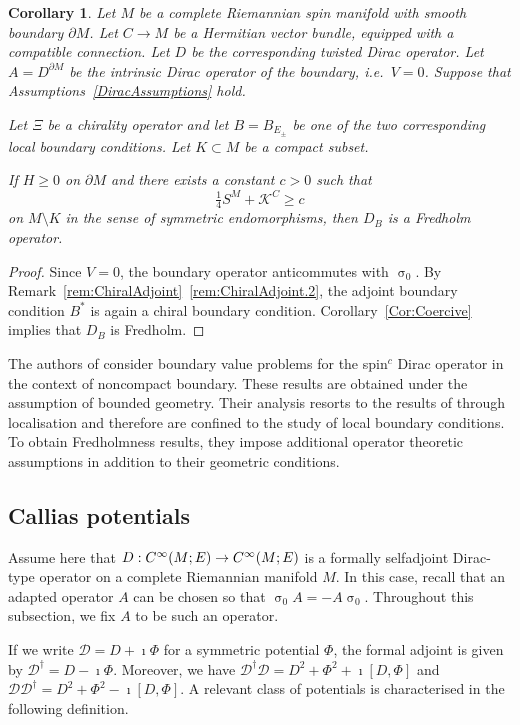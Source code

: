 \documentclass[a4paper,10pt,reqno]{amsart}
\newcommand{\sym}{\upsigma}
\newcommand{\Ck}[2][{}]{{\rm C}^{#2}_{\rm #1}}%
\newcommand{\KK}{\mathscr{K}}
\newcommand{\DDD}{\mathscr{D}}%
\newcommand{\dM}{\partial M}
\newtheorem{corollary}[theorem]{Corollary}
\theoremstyle{definition}
\begin{document}
\begin{corollary}\label{Cor:DiracLocalBVP}
Let $M$ be a complete Riemannian spin manifold with smooth boundary $\dM$.
Let $C\to M$ be a Hermitian vector bundle, equipped with a compatible connection.
Let $D$ be the corresponding twisted Dirac operator.
Let $A=D^{\dM}$ be the intrinsic Dirac operator of the boundary, i.e.\ $V=0$.
Suppose that Assumptions~\ref{DiracAssumptions} hold.

Let $\Xi$ be a chirality operator and let $B=B_{E_\pm}$ be one of the two corresponding local boundary conditions.
Let $K\subset M$ be a compact subset.


If $H\ge0$ on $\dM$ and there exists a constant $c>0$ such that
$$
\tfrac14 S^M + \KK^C \ge c
$$
on $M\setminus K$ in the sense of symmetric endomorphisms, then $D_B$ is a Fredholm operator.
\end{corollary}

\begin{proof}
Since $V=0$, the boundary operator anticommutes with $\sym_0$.
By Remark~\ref{rem:ChiralAdjoint}~\ref{rem:ChiralAdjoint.2}, the adjoint boundary condition $B^*$ is again a chiral boundary condition.
Corollary~\ref{Cor:Coercive} implies that $D_{B}$ is Fredholm.
\end{proof}

The authors of \cite{GN} consider boundary value problems for the spin$^c$ Dirac operator in the context of noncompact boundary.
These results are obtained under the assumption of  bounded geometry.
Their analysis resorts to the results of \cite{BB12} through localisation and therefore are confined to the study of local boundary conditions.
To obtain Fredholmness results, they impose additional operator theoretic assumptions in addition to their geometric conditions.

\subsection{Callias potentials}
\label{S:Callias}

Assume here that $D: \Ck{\infty}(M;E) \to \Ck{\infty}(M;E)$ is a formally selfadjoint Dirac-type operator on a complete Riemannian manifold $M$.
In this case, recall that an adapted operator $A$ can be chosen so that $\sym_0 A = - A \sym_0$. 
Throughout this subsection, we fix $A$ to be such an operator. 

If we write $\DDD = D + \imath \Phi$ for a symmetric potential $\Phi$, the formal adjoint is given by $\DDD^\dagger = D - \imath \Phi$.
Moreover, we have $\DDD^\dagger\DDD = D^2 + \Phi^2 + \imath[D,\Phi]$ and $\DDD\DDD^\dagger = D^2 + \Phi^2 - \imath[D,\Phi]$.
A relevant class of potentials is characterised in the following definition.
\end{document}
